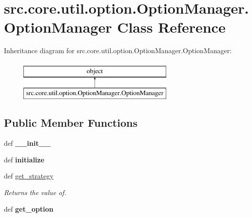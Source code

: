 \hypertarget{classsrc_1_1core_1_1util_1_1option_1_1OptionManager_1_1OptionManager}{\section{src.\-core.\-util.\-option.\-Option\-Manager.\-Option\-Manager Class Reference}
\label{classsrc_1_1core_1_1util_1_1option_1_1OptionManager_1_1OptionManager}
}
Inheritance diagram for src.\-core.\-util.\-option.\-Option\-Manager.\-Option\-Manager\-:\begin{figure}[H]
\begin{center}
\leavevmode
\includegraphics[height=2.000000cm]{classsrc_1_1core_1_1util_1_1option_1_1OptionManager_1_1OptionManager}
\end{center}
\end{figure}
\subsection*{Public Member Functions}
\begin{DoxyCompactItemize}
\item 
\hypertarget{classsrc_1_1core_1_1util_1_1option_1_1OptionManager_1_1OptionManager_ac2e9af25807a8fae0ce826d89f6102f3}{def {\bfseries \-\_\-\-\_\-init\-\_\-\-\_\-}}\label{classsrc_1_1core_1_1util_1_1option_1_1OptionManager_1_1OptionManager_ac2e9af25807a8fae0ce826d89f6102f3}

\item 
\hypertarget{classsrc_1_1core_1_1util_1_1option_1_1OptionManager_1_1OptionManager_aff51349ba99ce25c687dc9132730a6e9}{def {\bfseries initialize}}\label{classsrc_1_1core_1_1util_1_1option_1_1OptionManager_1_1OptionManager_aff51349ba99ce25c687dc9132730a6e9}

\item 
\hypertarget{classsrc_1_1core_1_1util_1_1option_1_1OptionManager_1_1OptionManager_a391500bba7b463361f751d0911a6eb2c}{def \hyperlink{classsrc_1_1core_1_1util_1_1option_1_1OptionManager_1_1OptionManager_a391500bba7b463361f751d0911a6eb2c}{get\-\_\-strategy}}\label{classsrc_1_1core_1_1util_1_1option_1_1OptionManager_1_1OptionManager_a391500bba7b463361f751d0911a6eb2c}

\begin{DoxyCompactList}\small\item\em Returns the value of. \end{DoxyCompactList}\item 
\hypertarget{classsrc_1_1core_1_1util_1_1option_1_1OptionManager_1_1OptionManager_a5f4094ae4988cf90298890172cc4e85d}{def {\bfseries get\-\_\-option}}\label{classsrc_1_1core_1_1util_1_1option_1_1OptionManager_1_1OptionManager_a5f4094ae4988cf90298890172cc4e85d}

\end{DoxyCompactItemize}
